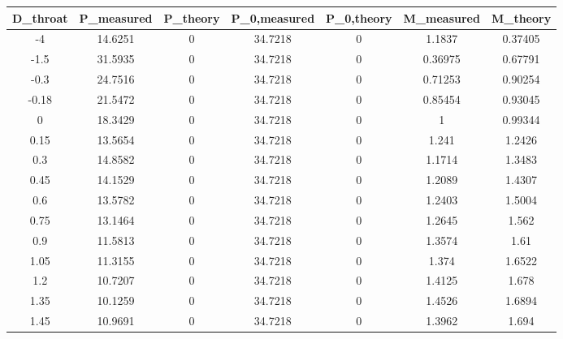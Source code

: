 \begin{tabular}{ccccccc}
\toprule
D_{throat} & P_{measured} & P_{theory} & P_{0,measured} & P_{0,theory} & M_{measured} & M_{theory} \\
\midrule
-4 & 14.6251 & 0 & 34.7218 & 0 & 1.1837 & 0.37405 \\ 
-1.5 & 31.5935 & 0 & 34.7218 & 0 & 0.36975 & 0.67791 \\ 
-0.3 & 24.7516 & 0 & 34.7218 & 0 & 0.71253 & 0.90254 \\ 
-0.18 & 21.5472 & 0 & 34.7218 & 0 & 0.85454 & 0.93045 \\ 
0 & 18.3429 & 0 & 34.7218 & 0 & 1 & 0.99344 \\ 
0.15 & 13.5654 & 0 & 34.7218 & 0 & 1.241 & 1.2426 \\ 
0.3 & 14.8582 & 0 & 34.7218 & 0 & 1.1714 & 1.3483 \\ 
0.45 & 14.1529 & 0 & 34.7218 & 0 & 1.2089 & 1.4307 \\ 
0.6 & 13.5782 & 0 & 34.7218 & 0 & 1.2403 & 1.5004 \\ 
0.75 & 13.1464 & 0 & 34.7218 & 0 & 1.2645 & 1.562 \\ 
0.9 & 11.5813 & 0 & 34.7218 & 0 & 1.3574 & 1.61 \\ 
1.05 & 11.3155 & 0 & 34.7218 & 0 & 1.374 & 1.6522 \\ 
1.2 & 10.7207 & 0 & 34.7218 & 0 & 1.4125 & 1.678 \\ 
1.35 & 10.1259 & 0 & 34.7218 & 0 & 1.4526 & 1.6894 \\ 
1.45 & 10.9691 & 0 & 34.7218 & 0 & 1.3962 & 1.694 \\ 
\bottomrule
\end{tabular}